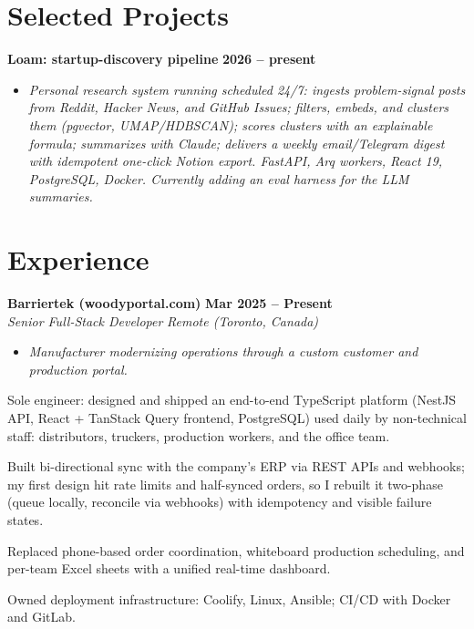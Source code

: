 \documentclass[letterpaper,10pt]{article}
\newcommand{\heading}[2]{
  \hspace{10pt}#1\hfill#2\\
}
\newcommand{\headingBf}[2]{
  \heading{\textbf{#1}}{\textbf{#2}}
}
\newcommand{\headingIt}[2]{
  \heading{\textit{#1}}{\textit{#2}}
}
\newenvironment{resume_list}{
  \vspace{-7pt}
  \begin{itemize}[itemsep=-2px, parsep=1pt, leftmargin=30pt]
}{
  \end{itemize}
  \vspace{1pt}
}
\newcommand{\companyDescription}[1]{
  \vspace{-7pt}
  \begin{itemize}[itemsep=-2px, parsep=1pt, leftmargin=12pt]
    \item[] {\color{textMuted}\textit{#1}}
  \end{itemize}
  \vspace{-4pt}
}
\begin{document}
  \section{Selected Projects}

  \headingBf{ Loam: startup-discovery pipeline }{ 2026 -- present }
  \companyDescription{ Personal research system running scheduled 24/7: ingests problem-signal posts from Reddit, Hacker News, and GitHub Issues; filters, embeds, and clusters them (pgvector, UMAP/HDBSCAN); scores clusters with an explainable formula; summarizes with Claude; delivers a weekly email/Telegram digest with idempotent one-click Notion export. FastAPI, Arq workers, React 19, PostgreSQL, Docker. Currently adding an eval harness for the LLM summaries. }

  \section{Experience}

  \headingBf{ Barriertek (woodyportal.com) }{ Mar 2025 -- Present }
  \headingIt{ Senior Full-Stack Developer }{ Remote (Toronto, Canada) }
  \companyDescription{ Manufacturer modernizing operations through a custom customer and production portal. }
  \begin{resume_list}
    \item Sole engineer: designed and shipped an end-to-end TypeScript platform (NestJS API, React + TanStack Query frontend, PostgreSQL) used daily by non-technical staff: distributors, truckers, production workers, and the office team.
    \item Built bi-directional sync with the company's ERP via REST APIs and webhooks; my first design hit rate limits and half-synced orders, so I rebuilt it two-phase (queue locally, reconcile via webhooks) with idempotency and visible failure states.
    \item Replaced phone-based order coordination, whiteboard production scheduling, and per-team Excel sheets with a unified real-time dashboard.
    \item Owned deployment infrastructure: Coolify, Linux, Ansible; CI/CD with Docker and GitLab.
  \end{resume_list}
\end{document}
